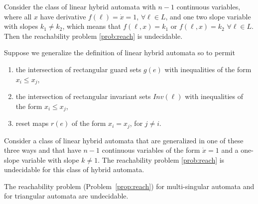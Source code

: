 \begin{thm}
Consider the class of linear hybrid automata with $n-1$ continuous variables, where all $x$ have derivative $f(\ell)=\dot{x}=1$, $\forall\ell\in L$, and one two slope variable with slopes $k_{1}\neq k_{2}$, which means that $f(\ell,x)=k_{1}$ or $f(\ell,x)=k_{2}$ $\forall\ell\in L$. Then the reachability problem \ref{prob:reach} is undecidable.
\end{thm}

\begin{thm}
Suppose we generalize the definition of linear hybrid automata so to permit
\begin{enumerate}
    \item{the intersection of rectangular guard sets $g(e)$ with inequalities of the form $x_{i}\leq x_{j}$,}
    \item{the intersection of rectangular invariant sets $Inv(\ell)$ with inequalities of the form $x_{i}\leq x_{j}$,}
    \item{reset maps $r(e)$ of the form $x_{i}=x_{j}$, for $j\neq i$.}
\end{enumerate}
Consider a class of linear hybrid automata that are generalized in one of these three ways and that have $n-1$ continuous variables of the form $\dot{x}=1$ and a one-slope variable with slope $k\neq1$. The reachability problem \ref{prob:reach} is undecidable for this class of hybrid automata.
\end{thm}

\begin{thm}
The reachability problem (Problem~\ref{prop:reach}) for multi-singular automata and for triangular automata are undecidable.
\end{thm}
